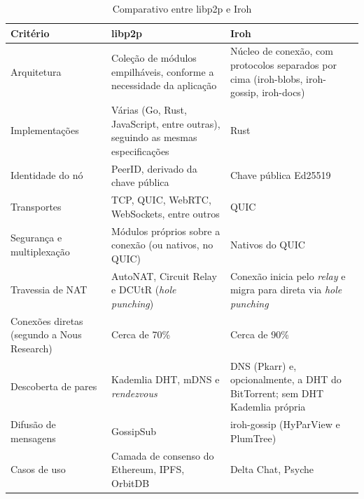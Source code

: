\begin{table}[htb]
    \centering
    \caption{Comparativo entre libp2p e Iroh}
    \label{tab:libp2p-iroh}
    \begin{tabular}{|p{}|p{}|p{}|}
        \hline
        \textbf{Critério} & \textbf{libp2p} & \textbf{Iroh} \\ \hline
        Arquitetura & Coleção de módulos empilháveis, conforme a necessidade da aplicação & Núcleo de conexão, com protocolos separados por cima (iroh-blobs, iroh-gossip, iroh-docs) \\ \hline
        Implementações & Várias (Go, Rust, JavaScript, entre outras), seguindo as mesmas especificações & Rust \\ \hline
        Identidade do nó & PeerID, derivado da chave pública & Chave pública Ed25519 \\ \hline
        Transportes & TCP, QUIC, WebRTC, WebSockets, entre outros & QUIC \\ \hline
        Segurança e multiplexação & Módulos próprios sobre a conexão (ou nativos, no QUIC) & Nativos do QUIC \\ \hline
        Travessia de NAT & AutoNAT, Circuit Relay e DCUtR (\textit{hole punching}) & Conexão inicia pelo \textit{relay} e migra para direta via \textit{hole punching} \\ \hline
        Conexões diretas (segundo a Nous Research) & Cerca de 70\% & Cerca de 90\% \\ \hline
        Descoberta de pares & Kademlia DHT, mDNS e \textit{rendezvous} & DNS (Pkarr) e, opcionalmente, a DHT do BitTorrent; sem DHT Kademlia própria \\ \hline
        Difusão de mensagens & GossipSub & iroh-gossip (HyParView e PlumTree) \\ \hline
        Casos de uso & Camada de consenso do Ethereum, IPFS, OrbitDB & Delta Chat, Psyche \\ \hline
    \end{tabular}
\end{table}

